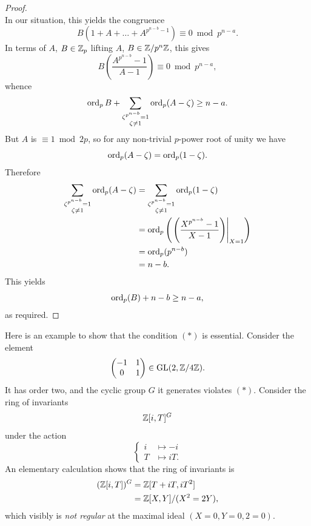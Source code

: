 \begin{proof}
\[\]
In our situation, this yields the congruence
\[
B(1 + A + \dots + A^{p^{n-b}-1}) \equiv 0 \bmod p^{n-a} .
\]
In terms of $A$, $B \in \mathbb{Z}_p$ lifting $A$, $B \in \mathbb{Z}/p^n\mathbb{Z}$, this gives
\[
B\left(\frac{A^{p^{n-b}}-1}{A-1}\right) \equiv 0 \bmod p^{n-a} ,
\]
whence
\[
\operatorname{ord}_p B + \sum_{\substack{\zeta^{p^{n-b}} = 1 \\ \zeta \ne 1}} \operatorname{ord}_p(A - \zeta) \ge n - a .
\]
But $A$ is $\equiv 1 \bmod 2p$, so for any non-trivial $p$-power root of unity we have
\[
\operatorname{ord}_p(A - \zeta) = \operatorname{ord}_p(1 - \zeta) .
\]
Therefore
\begin{align*}
\sum_{\substack{\zeta^{p^{n-b}} = 1 \\ \zeta \ne 1}} \operatorname{ord}_p(A - \zeta) &= \sum_{\substack{\zeta^{p^{n-b}} = 1 \\ \zeta \ne 1}} \operatorname{ord}_p(1 - \zeta) \\
&= \operatorname{ord}_p\left(\left.\left(\frac{X^{p^{n-b}}-1}{X-1}\right)\right|_{X=1}\right) \\
&= \operatorname{ord}_p(p^{n-b}) \\
&= n - b .
\end{align*}
This yields
\[
\operatorname{ord}_p(B) + n - b \ge n - a ,
\]
as required.
\end{proof}

\begin{krem}\label{rem:10.10.5}
Here is an example to show that the condition $(*)$ is essential. Consider the element
\[
\begin{pmatrix} -1 & 1 \\ 0 & 1 \end{pmatrix} \in \operatorname{GL}(2, \mathbb{Z}/4\mathbb{Z}) .
\]
It has order two, and the cyclic group $G$ it generates violates $(*)$. Consider the ring of invariants
\[
\mathbb{Z}[i, T]^G
\]
under the action
\[
\left\{
\begin{aligned}
i &\mapsto -i \\
T &\mapsto iT .
\end{aligned}
\right.
\]
An elementary calculation shows that the ring of invariants is
\begin{align*}
(\mathbb{Z}[i, T])^G &= \mathbb{Z}[T + iT, iT^2] \\
&= \mathbb{Z}[X, Y]/(X^2 = 2Y) ,
\end{align*}
which visibly is \emph{not regular} at the maximal ideal $(X = 0, Y = 0, 2 = 0)$.
\end{krem}

